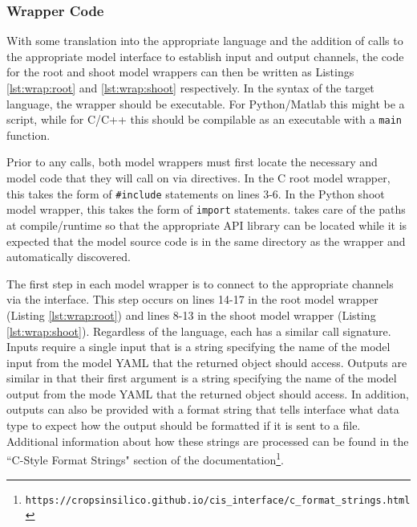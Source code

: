 \documentclass[journal]{IEEEtran}
\newcommand{\todo}[1]{{\color{red}{#1}}}
\newcommand{\pkg}{{\tt \todo{cis\_interface}}{}}
\newcommand{\rootwrap}{}
\newcommand{\shootwrap}{}
\begin{document}
\subsubsection{Wrapper Code}
%
With some translation into the appropriate language and the addition of calls to the appropriate {\pkg} model interface to establish input and output channels, the code for the root and shoot model wrappers can then be written as Listings \ref{lst:wrap:root} and \ref{lst:wrap:shoot} respectively. In the syntax of the target language, the wrapper should be executable. For Python/Matlab this might be a script, while for C/C++ this should be compilable as an executable with a {\tt main} function.
%
\rootwrap
%
\shootwrap
%
Prior to any calls, both model wrappers must first locate the necessary {\pkg} and model code that they will call on via directives. In the C root model wrapper, this takes the form of {\tt \#include} statements on lines 3-6. In the Python shoot model wrapper, this takes the form of {\tt import} statements. {\pkg} takes care of the paths at compile/runtime so that the appropriate API library can be located while it is expected that the model source code is in the same directory as the wrapper and automatically discovered.

The first step in each model wrapper is to connect to the appropriate channels via the {\pkg} interface. This step occurs on lines 14-17 in the root model wrapper (Listing \ref{lst:wrap:root}) and lines 8-13 in the shoot model wrapper (Listing \ref{lst:wrap:shoot}). Regardless of the language, each has a similar call signature. Inputs require a single input that is a string specifying the name of the model input from the model YAML that the returned object should access. Outputs are similar in that their first argument is a string specifying the name of the model output from the mode YAML that the returned object should access. In addition, outputs can also be provided with a format string that tells {\pkg} interface what data type to expect how the output should be formatted if it is sent to a file. Additional information about how these strings are processed can be found in the ``C-Style Format Strings" section of the documentation\footnote{{\tt https://cropsinsilico.github.io/cis\_interface/c\_format\_strings.html}}.
\end{document}
